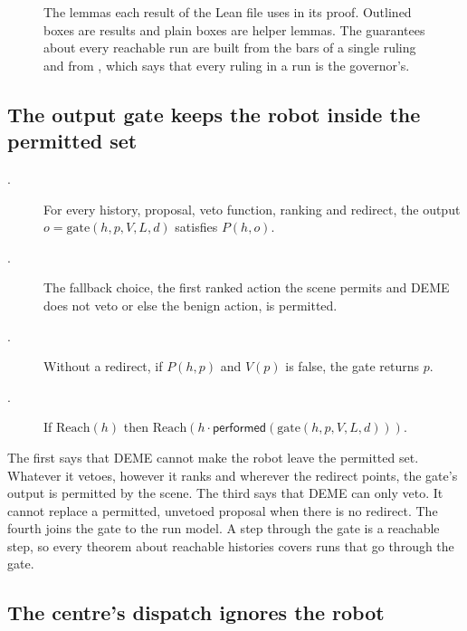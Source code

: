 \begin{figure}[t]
  \centering
  \resizebox{\textwidth}{!}{}
  \caption{The lemmas each result of the Lean file uses in its proof. Outlined boxes are
  results and plain boxes are helper lemmas. The guarantees about every reachable run are built
  from the bars of a single ruling and from , which says that every
  ruling in a run is the governor's.}
  \label{fig:lean-proofs}
\end{figure}

\subsection{The output gate keeps the robot inside the permitted set}

\begin{description}
  \item[.] For every history, proposal, veto function, ranking and
  redirect, the output $o = \mathrm{gate}(h, p, V, L, d)$ satisfies $P(h, o)$.
  \item[.] The fallback choice, the first ranked action the scene
  permits and DEME does not veto or else the benign action, is permitted.
  \item[.] Without a redirect, if $P(h, p)$ and $V(p)$ is false, the gate
  returns $p$.
  \item[.] If $\mathrm{Reach}(h)$ then
  $\mathrm{Reach}(h \cdot \mathsf{performed}(\mathrm{gate}(h, p, V, L, d)))$.
\end{description}
The first says that DEME cannot make the robot leave the permitted set.
Whatever it vetoes, however it ranks and wherever the redirect points, the gate's output is
permitted by the scene.
The third says that DEME can only veto.
It cannot replace a permitted, unvetoed proposal when there is no redirect.
The fourth joins the gate to the run model.
A step through the gate is a reachable step, so every theorem about reachable histories covers
runs that go through the gate.

\subsection{The centre's dispatch ignores the robot}

